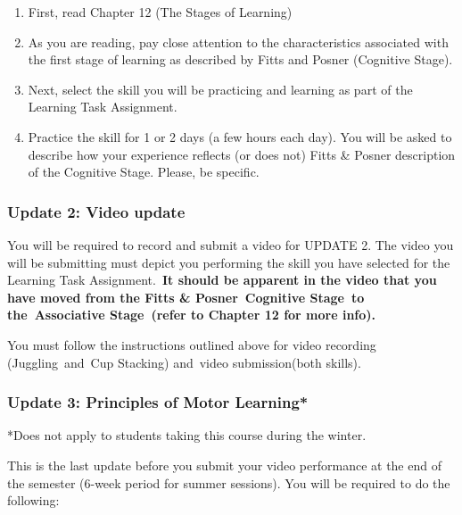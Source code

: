 \documentclass[
  letterpaper,
  DIV=11,
  numbers=noendperiod]{scrartcl}
\providecommand{\tightlist}{%
  \setlength{\itemsep}{0pt}\setlength{\parskip}{0pt}}\usepackage{longtable,booktabs,array}
\begin{document}
\begin{enumerate}
\def\labelenumi{\arabic{enumi}.}
\tightlist
\item
  First, read Chapter 12 (The Stages of Learning)
\item
  As you are reading, pay close attention to the characteristics
  associated with the first stage of learning as described by Fitts and
  Posner (Cognitive Stage).
\item
  Next, select the skill you will be practicing and learning as part of
  the Learning Task Assignment.~
\item
  Practice the skill for 1 or 2 days (a few hours each day). You will be
  asked to describe how your experience reflects (or does not) Fitts \&
  Posner description of the Cognitive Stage. Please, be specific.~
\end{enumerate}

\hypertarget{update-2-video-update}{%
\subsubsection{Update 2: Video update}\label{update-2-video-update}}

You will be required to record and submit a video for UPDATE 2. The
video you will be submitting must depict you performing the skill you
have selected for the Learning Task Assignment.~\textbf{It should be
apparent in the video that you have moved from the Fitts \&
Posner~Cognitive Stage~to the~Associative Stage~(refer to Chapter 12 for
more info).}

You must follow the instructions outlined above for video recording
(Juggling~and~Cup Stacking) and~video submission(both skills).

\hypertarget{update-3-principles-of-motor-learning}{%
\subsubsection{Update 3: Principles of Motor
Learning*}\label{update-3-principles-of-motor-learning}}

*Does not apply to students taking this course during the winter.

This is the last update before you submit your video performance at the
end of the semester (6-week period for summer sessions). You will be
required to do the following:
\end{document}
